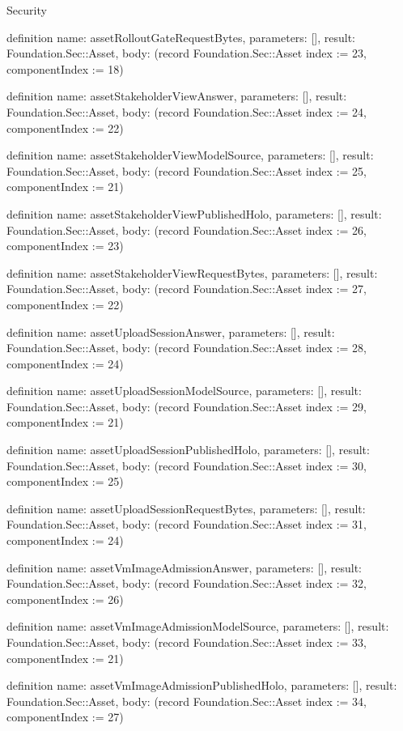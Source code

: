 \begin{lexlean}{Security}
\begin{semanticmodule}
definition{
  name: assetRolloutGateRequestBytes,
  parameters: [],
  result: Foundation.Sec::Asset,
  body: (record Foundation.Sec::Asset {index := 23, componentIndex := 18})
}

definition{
  name: assetStakeholderViewAnswer,
  parameters: [],
  result: Foundation.Sec::Asset,
  body: (record Foundation.Sec::Asset {index := 24, componentIndex := 22})
}

definition{
  name: assetStakeholderViewModelSource,
  parameters: [],
  result: Foundation.Sec::Asset,
  body: (record Foundation.Sec::Asset {index := 25, componentIndex := 21})
}

definition{
  name: assetStakeholderViewPublishedHolo,
  parameters: [],
  result: Foundation.Sec::Asset,
  body: (record Foundation.Sec::Asset {index := 26, componentIndex := 23})
}

definition{
  name: assetStakeholderViewRequestBytes,
  parameters: [],
  result: Foundation.Sec::Asset,
  body: (record Foundation.Sec::Asset {index := 27, componentIndex := 22})
}

definition{
  name: assetUploadSessionAnswer,
  parameters: [],
  result: Foundation.Sec::Asset,
  body: (record Foundation.Sec::Asset {index := 28, componentIndex := 24})
}

definition{
  name: assetUploadSessionModelSource,
  parameters: [],
  result: Foundation.Sec::Asset,
  body: (record Foundation.Sec::Asset {index := 29, componentIndex := 21})
}

definition{
  name: assetUploadSessionPublishedHolo,
  parameters: [],
  result: Foundation.Sec::Asset,
  body: (record Foundation.Sec::Asset {index := 30, componentIndex := 25})
}

definition{
  name: assetUploadSessionRequestBytes,
  parameters: [],
  result: Foundation.Sec::Asset,
  body: (record Foundation.Sec::Asset {index := 31, componentIndex := 24})
}

definition{
  name: assetVmImageAdmissionAnswer,
  parameters: [],
  result: Foundation.Sec::Asset,
  body: (record Foundation.Sec::Asset {index := 32, componentIndex := 26})
}

definition{
  name: assetVmImageAdmissionModelSource,
  parameters: [],
  result: Foundation.Sec::Asset,
  body: (record Foundation.Sec::Asset {index := 33, componentIndex := 21})
}

definition{
  name: assetVmImageAdmissionPublishedHolo,
  parameters: [],
  result: Foundation.Sec::Asset,
  body: (record Foundation.Sec::Asset {index := 34, componentIndex := 27})
}


\end{semanticmodule}
\end{lexlean}
